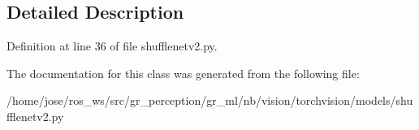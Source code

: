 \subsection{Detailed Description}


Definition at line 36 of file shufflenetv2.\+py.



The documentation for this class was generated from the following file\+:\begin{DoxyCompactItemize}
\item 
/home/jose/ros\+\_\+ws/src/gr\+\_\+perception/gr\+\_\+ml/nb/vision/torchvision/models/shufflenetv2.\+py\end{DoxyCompactItemize}

